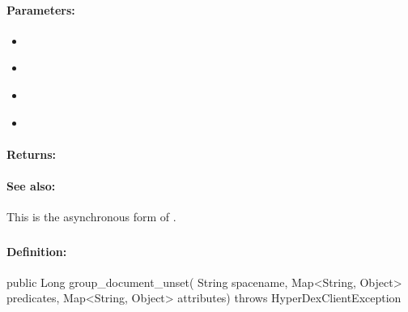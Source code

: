 \paragraph{Parameters:}
\begin{itemize}[noitemsep]
\item {}\\

\item {}\\

\item {}\\

\item {}\\

\end{itemize}

\paragraph{Returns:}


\paragraph{See also:}  This is the asynchronous form of .

\pagebreak
\subsubsection{}
\label{api:java:group_document_unset}


\paragraph{Definition:}
\begin{javacode}
public Long group_document_unset(
        String spacename,
        Map<String, Object> predicates,
        Map<String, Object> attributes) throws HyperDexClientException
\end{javacode}

